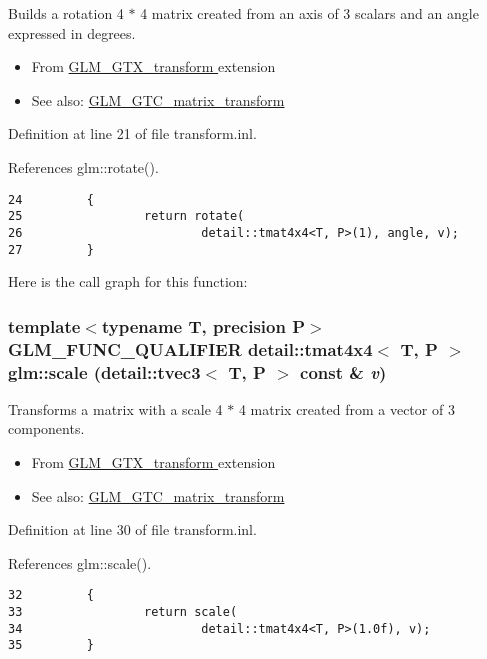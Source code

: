 Builds a rotation 4 $\ast$ 4 matrix created from an axis of 3 scalars and an angle expressed in degrees.\begin{itemize}
\item From \hyperlink{group__gtx__transform}{GLM\_\-GTX\_\-transform } extension\item See also: \hyperlink{group__gtc__matrix__transform_g1a75da872120125437265872423e0b14}{GLM\_\-GTC\_\-matrix\_\-transform } \end{itemize}


Definition at line 21 of file transform.inl.

References glm::rotate().

\begin{Code}\begin{verbatim}24         {
25                 return rotate(
26                         detail::tmat4x4<T, P>(1), angle, v);
27         }
\end{verbatim}
\end{Code}




Here is the call graph for this function:\hypertarget{group__gtx__transform_g70f2d33f150672b9faca3b477fcca2c4}{
\subsubsection[scale]{\setlength{\rightskip}{0pt plus 5cm}template$<$typename T, precision P$>$ GLM\_\-FUNC\_\-QUALIFIER detail::tmat4x4$<$ T, P $>$ glm::scale (detail::tvec3$<$ T, P $>$ const \& {\em v})}}
\label{group__gtx__transform_g70f2d33f150672b9faca3b477fcca2c4}


Transforms a matrix with a scale 4 $\ast$ 4 matrix created from a vector of 3 components.\begin{itemize}
\item From \hyperlink{group__gtx__transform}{GLM\_\-GTX\_\-transform } extension\item See also: \hyperlink{group__gtc__matrix__transform_g5e2bf1cdf124863558884751d611aea6}{GLM\_\-GTC\_\-matrix\_\-transform } \end{itemize}


Definition at line 30 of file transform.inl.

References glm::scale().

\begin{Code}\begin{verbatim}32         {
33                 return scale(
34                         detail::tmat4x4<T, P>(1.0f), v);
35         }
\end{verbatim}
\end{Code}




